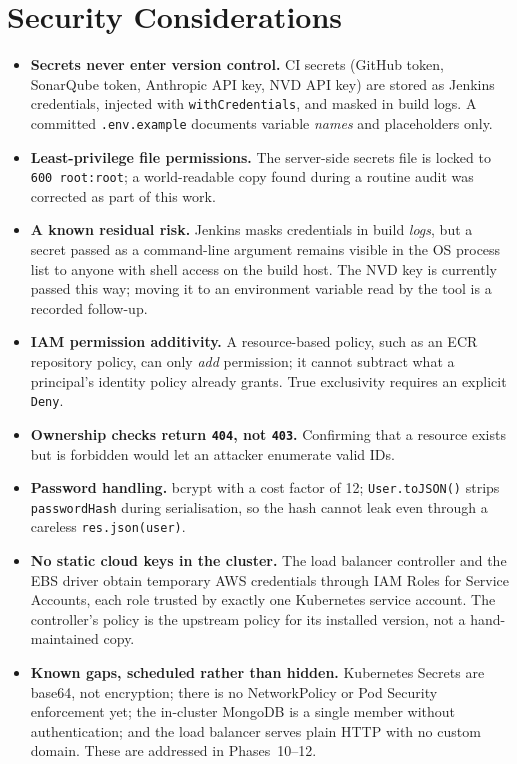 \documentclass[11pt,a4paper]{article}
\begin{document}
\section{Security Considerations}
\begin{itemize}[nosep]
    \item \textbf{Secrets never enter version control.} CI secrets (GitHub
        token, SonarQube token, Anthropic API key, NVD API key) are stored
        as Jenkins credentials, injected with \texttt{withCredentials}, and
        masked in build logs. A committed \texttt{.env.example} documents
        variable \emph{names} and placeholders only.
    \item \textbf{Least-privilege file permissions.} The server-side
        secrets file is locked to \texttt{600 root:root}; a world-readable
        copy found during a routine audit was corrected as part of this
        work.
    \item \textbf{A known residual risk.} Jenkins masks credentials in
        build \emph{logs}, but a secret passed as a command-line argument
        remains visible in the OS process list to anyone with shell access
        on the build host. The NVD key is currently passed this way;
        moving it to an environment variable read by the tool is a
        recorded follow-up.
    \item \textbf{IAM permission additivity.} A resource-based policy, such
        as an ECR repository policy, can only \emph{add} permission; it
        cannot subtract what a principal's identity policy already grants.
        True exclusivity requires an explicit \texttt{Deny}.
    \item \textbf{Ownership checks return \texttt{404}, not \texttt{403}.}
        Confirming that a resource exists but is forbidden would let an
        attacker enumerate valid IDs.
    \item \textbf{Password handling.} bcrypt with a cost factor of 12;
        \texttt{User.toJSON()} strips \texttt{passwordHash} during
        serialisation, so the hash cannot leak even through a careless
        \texttt{res.json(user)}.
    \item \textbf{No static cloud keys in the cluster.} The load balancer
        controller and the EBS driver obtain temporary AWS credentials through
        IAM Roles for Service Accounts, each role trusted by exactly one
        Kubernetes service account. The controller's policy is the upstream
        policy for its installed version, not a hand-maintained copy.
    \item \textbf{Known gaps, scheduled rather than hidden.} Kubernetes Secrets
        are base64, not encryption; there is no NetworkPolicy or Pod Security
        enforcement yet; the in-cluster MongoDB is a single member without
        authentication; and the load balancer serves plain HTTP with no custom
        domain. These are addressed in Phases~10--12.
\end{itemize}
\end{document}
